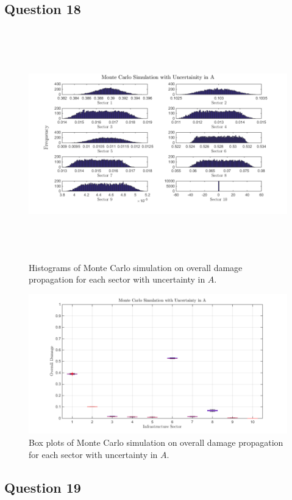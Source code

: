 \documentclass[11pt,a4paper]{article}
\begin{document}
\subsection*{Question 18}
\begin{figure}
	\centering
	\includegraphics[width=1\textwidth, height=10cm]
    {monte_carlo_A_1000_100.png}
    \caption{Histograms of Monte Carlo simulation on overall damage propagation for each sector with uncertainty in $A$.}
    \label{fig: Histograms Monte Carlo A}
\end{figure}
\begin{figure}
	\centering
	\includegraphics[width=1\textwidth]
    {monte_carlo_A_1000_100_box_plot.png}
    \caption{Box plots of Monte Carlo simulation on overall damage propagation for each sector with uncertainty in $A$.}
    \label{fig: Box Plots Monte Carlo A}
\end{figure}

\subsection*{Question 19}
\end{document}
